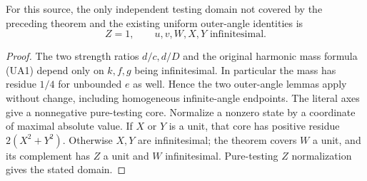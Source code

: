 \begin{corollary}
For this source, the only independent testing domain not covered by
the preceding theorem and the existing uniform outer-angle identities
is
\[
 Z=1,\qquad u,v,W,X,Y\text{ infinitesimal}.
\]
\end{corollary}
\begin{proof}
The two strength ratios $d/c,d/D$ and the original harmonic mass
formula (UA1) depend only on $k,f,g$ being infinitesimal.  In particular
the mass has residue $1/4$ for unbounded $e$ as well.  Hence the two
outer-angle lemmas apply without change, including homogeneous
infinite-angle endpoints.  The literal axes give a nonnegative
pure-testing core.  Normalize a nonzero state by a coordinate of
maximal absolute value.  If $X$ or $Y$ is a unit, that core has positive
residue $2(X^2+Y^2)$.  Otherwise $X,Y$ are infinitesimal; the theorem
covers $W$ a unit, and its complement has $Z$ a unit and $W$
infinitesimal.  Pure-testing $Z$ normalization gives the stated domain.
\end{proof}
